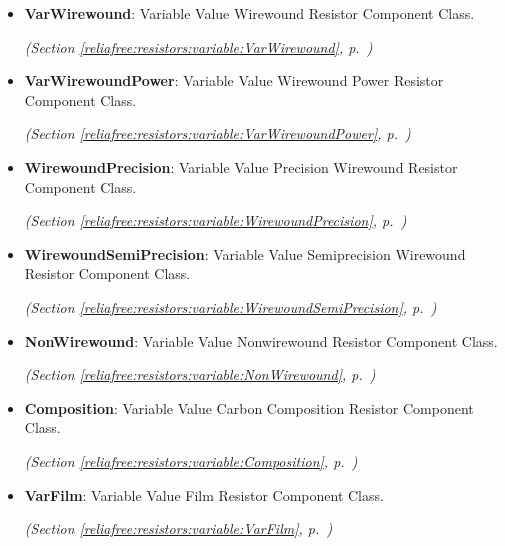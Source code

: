 \begin{itemize}  \setlength{\parskip}{0ex}
  \item \textbf{VarWirewound}: Variable Value Wirewound Resistor Component Class.



  \textit{(Section \ref{reliafree:resistors:variable:VarWirewound}, p.~\pageref{reliafree:resistors:variable:VarWirewound})}

  \item \textbf{VarWirewoundPower}: Variable Value Wirewound Power Resistor Component Class.



  \textit{(Section \ref{reliafree:resistors:variable:VarWirewoundPower}, p.~\pageref{reliafree:resistors:variable:VarWirewoundPower})}

  \item \textbf{WirewoundPrecision}: Variable Value Precision Wirewound Resistor Component Class.



  \textit{(Section \ref{reliafree:resistors:variable:WirewoundPrecision}, p.~\pageref{reliafree:resistors:variable:WirewoundPrecision})}

  \item \textbf{WirewoundSemiPrecision}: Variable Value Semiprecision Wirewound Resistor Component Class.



  \textit{(Section \ref{reliafree:resistors:variable:WirewoundSemiPrecision}, p.~\pageref{reliafree:resistors:variable:WirewoundSemiPrecision})}

  \item \textbf{NonWirewound}: Variable Value Nonwirewound Resistor Component Class.



  \textit{(Section \ref{reliafree:resistors:variable:NonWirewound}, p.~\pageref{reliafree:resistors:variable:NonWirewound})}

  \item \textbf{Composition}: Variable Value Carbon Composition Resistor Component Class.



  \textit{(Section \ref{reliafree:resistors:variable:Composition}, p.~\pageref{reliafree:resistors:variable:Composition})}

  \item \textbf{VarFilm}: Variable Value Film Resistor Component Class.



  \textit{(Section \ref{reliafree:resistors:variable:VarFilm}, p.~\pageref{reliafree:resistors:variable:VarFilm})}

\end{itemize}

